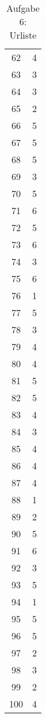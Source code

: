 \documentclass[12pt,a4paper]{article}
\begin{document}
\begin{table}[h]
\begin{tabular}[h]{*{2}{c}}
            62 & 4 \\
            63 & 3 \\
            64 & 3 \\
            65 & 2 \\
            66 & 5 \\
            67 & 5 \\
            68 & 5 \\
            69 & 3 \\
            70 & 5 \\
            71 & 6 \\
            72 & 5 \\
            73 & 6 \\
            74 & 3 \\
            75 & 6 \\
            76 & 1 \\
            77 & 5 \\
            78 & 3 \\
            79 & 4 \\
            80 & 4 \\
            81 & 5 \\
            82 & 5 \\
            83 & 4 \\
            84 & 3 \\
            85 & 4 \\
            86 & 4 \\
            87 & 4 \\
            88 & 1 \\
            89 & 2 \\
            90 & 5 \\
            91 & 6 \\
            92 & 3 \\
            93 & 5 \\
            94 & 1 \\
            95 & 5 \\
            96 & 5 \\
            97 & 2 \\
            98 & 3 \\
            99 & 2 \\
            100 & 4 \\
            \hline
        \end{tabular}

        \caption{Aufgabe 6: Urliste}
        \label{tab:urliste}
    \end{table}
\end{document}

